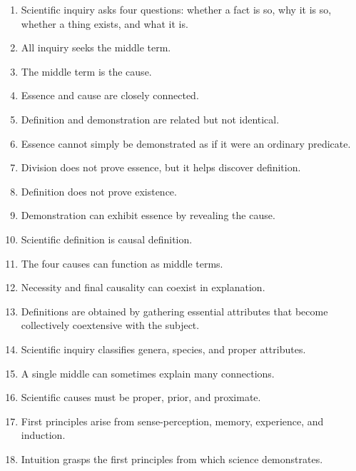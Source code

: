 \documentclass[12pt]{article}
\begin{document}
\begin{enumerate}[itemsep=0.5em]
    \item Scientific inquiry asks four questions: whether a fact is so, why it is
    so, whether a thing exists, and what it is.

    \item All inquiry seeks the middle term.

    \item The middle term is the cause.

    \item Essence and cause are closely connected.

    \item Definition and demonstration are related but not identical.

    \item Essence cannot simply be demonstrated as if it were an ordinary
    predicate.

    \item Division does not prove essence, but it helps discover definition.

    \item Definition does not prove existence.

    \item Demonstration can exhibit essence by revealing the cause.

    \item Scientific definition is causal definition.

    \item The four causes can function as middle terms.

    \item Necessity and final causality can coexist in explanation.

    \item Definitions are obtained by gathering essential attributes that become
    collectively coextensive with the subject.

    \item Scientific inquiry classifies genera, species, and proper attributes.

    \item A single middle can sometimes explain many connections.

    \item Scientific causes must be proper, prior, and proximate.

    \item First principles arise from sense-perception, memory, experience, and
    induction.

    \item Intuition grasps the first principles from which science demonstrates.
\end{enumerate}
\end{document}
